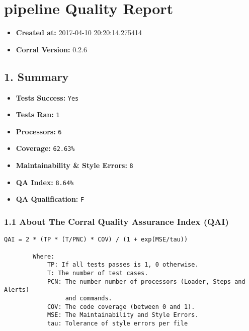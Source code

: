 \section{pipeline Quality Report}\label{pipeline-quality-report}

\begin{itemize}
\tightlist
\item
  \textbf{Created at:} 2017-04-10 20:20:14.275414
\item
  \textbf{Corral Version:} 0.2.6
\end{itemize}

\subsection{1. Summary}\label{summary}

\begin{itemize}
\tightlist
\item
  \textbf{Tests Success:} \texttt{Yes}
\item
  \textbf{Tests Ran:} \texttt{1}
\item
  \textbf{Processors:} \texttt{6}
\item
  \textbf{Coverage:} \texttt{62.63\%}
\item
  \textbf{Maintainability \& Style Errors:} \texttt{8}
\end{itemize}

\begin{itemize}
\tightlist
\item
  \textbf{QA Index:} \texttt{8.64\%}
\item
  \textbf{QA Qualification:} \texttt{F}
\end{itemize}

\subsubsection{1.1 About The Corral Quality Assurance Index
(QAI)}\label{about-the-corral-quality-assurance-index-qai}

\begin{verbatim}
QAI = 2 * (TP * (T/PNC) * COV) / (1 + exp(MSE/tau))

        Where:
            TP: If all tests passes is 1, 0 otherwise.
            T: The number of test cases.
            PCN: The number number of processors (Loader, Steps and Alerts)
                 and commands.
            COV: The code coverage (between 0 and 1).
            MSE: The Maintainability and Style Errors.
            tau: Tolerance of style errors per file

\end{verbatim}

